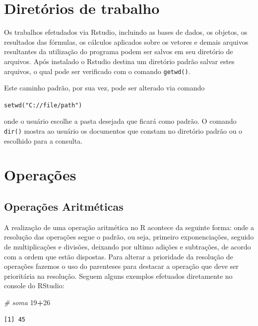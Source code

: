 \documentclass[12pt,brazil,oneside]{book}
\newenvironment{Shaded}{\begin{snugshade}}{\end{snugshade}}
\newcommand{\CommentTok}[1]{\textcolor[rgb]{0.56,0.35,0.01}{\textit{#1}}}
\newcommand{\DecValTok}[1]{\textcolor[rgb]{0.00,0.00,0.81}{#1}}
\newcommand{\OperatorTok}[1]{\textcolor[rgb]{0.81,0.36,0.00}{\textbf{#1}}}
\begin{document}
\hypertarget{diretorios-de-trabalho}{%
\section{Diretórios de trabalho}\label{diretorios-de-trabalho}}

Os trabalhos efetudados via Rstudio, incluindo as bases de dados, os objetos, os resultados das fórmulas, os cálculos aplicados sobre os vetores e demais arquivos resultantes da utilização do programa podem ser salvos em seu diretório de arquivos. Após instalado o Rstudio destina um diretório padrão salvar estes arquivos, o qual pode ser verificado com o comando \texttt{getwd()}.

Este caminho padrão, por sua vez, pode ser alterado via comando

\texttt{setwd("C://file/path")}

onde o usuário escolhe a pasta desejada que ficará como padrão. O comando \texttt{dir()} mostra ao usuário os documentos que constam no diretório padrão ou o escolhido para a consulta.

\hypertarget{operacoes}{%
\section{Operações}\label{operacoes}}

\hypertarget{operacoes-aritmeticas}{%
\subsection{Operações Aritméticas}\label{operacoes-aritmeticas}}

A realização de uma operação aritmética no R acontece da seguinte forma: onde a resolução das operações segue o padrão, ou seja, primeiro exponenciações, seguido de multiplicações e divisões, deixando por ultimo adições e subtrações, de acordo com a ordem que estão dispostas. Para alterar a prioridade da resolução de operações fazemos o uso do parenteses para destacar a operação que deve ser prioritária na resolução. Seguem alguns exemplos efetuados diretamente no console do RStudio:

\begin{Shaded}
\begin{Highlighting}[]
\CommentTok{# soma}
\DecValTok{19}\OperatorTok{+}\DecValTok{26}
\end{Highlighting}
\end{Shaded}

\begin{verbatim}
[1] 45
\end{verbatim}
\end{document}
